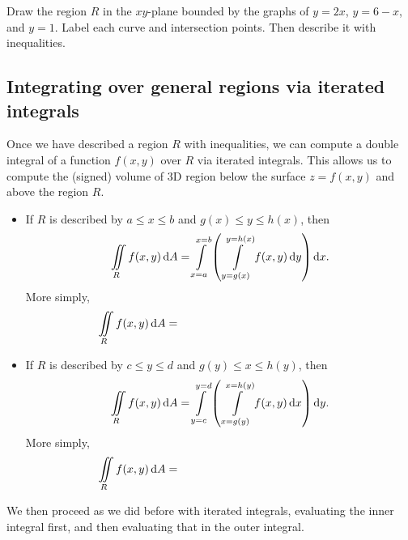 \vfill 

\begin{ex}
    Draw the region $R$ in the $xy$-plane bounded by the graphs of $y=2x$, $y=6-x$, and $y=1$. Label each curve and intersection points. Then describe it with inequalities.
\end{ex}

\vfill 

\pagebreak 

\subsection{Integrating over general regions via iterated integrals}
Once we have described a region $R$ with inequalities, we can compute a double integral of a function $f(x,y)$ over $R$ via iterated integrals. This allows us to compute the (signed) volume of 3D region below the surface $z=f(x,y)$ and above the region $R$.
\begin{itemize}
    \item If $R$ is described by $a\le x\le b$ and $g(x)\le y\le h(x)$, then \[\iint\limits_R f(x,y)\mathop{}\!\mathrm{d} A = \int\limits_{x=a}^{x=b} \left(\,\int\limits_{y=g(x)}^{y=h(x)}f(x,y)\mathop{}\!\mathrm{d} y\right)\mathop{}\!\mathrm{d} x.\]
    More simply, 
    \[
        \iint\limits_R f(x,y)\mathop{}\!\mathrm{d} A = \hspace{2in}
    \]
    \item If $R$ is described by $c\le y\le d$ and $g(y)\le x\le h(y)$, then 
    \[
        \iint\limits_R f(x,y)\mathop{}\!\mathrm{d} A = \int\limits_{y=c}^{y=d} \left(\,\int\limits_{x=g(y)}^{x=h(y)}f(x,y)\mathop{}\!\mathrm{d} x\right)\mathop{}\!\mathrm{d} y.
    \]
    More simply, 
    \[
        \iint\limits_R f(x,y)\mathop{}\!\mathrm{d} A = \hspace{2in}
    \]
\end{itemize}
We then proceed as we did before with iterated integrals, evaluating the inner integral first, and then evaluating that in the outer integral.

